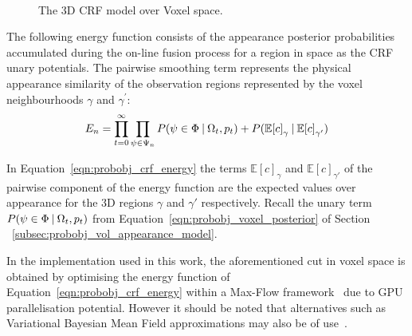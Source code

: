 \begin{figure}[!htbp]
{
  }
  \caption[3D CRF over Voxels]
  {The 3D CRF model over Voxel space.}
~\label{figure:probobj_crf}
\end{figure}

The following energy function consists of the appearance posterior probabilities
accumulated during the on-line fusion process for a region in space as the
CRF unary potentials. The pairwise smoothing term represents the physical
appearance similarity of the observation regions represented by the
voxel neighbourhoods \( \gamma \) and \( \gamma^{'} \):
\begin{equation}
  \label{eqn:probobj_crf_energy}
  E_{n} = \prod_{t=0}^{\infty} \prod_{\psi \in \Psi_{n}}
  P(\psi \in \Phi \:\vert\: \Omega_{t}, p_{t}) +
  P(\mathbb{E}{[c]}_{\gamma} \:\vert\: \mathbb{E}{[c]}_{\gamma'})
\end{equation}

In Equation~\ref{eqn:probobj_crf_energy} the terms \(\mathbb{E}{[c]}_{\gamma}\) and
\(\mathbb{E}{[c]}_{\gamma'}\) of the pairwise component of the energy function are
the expected values over appearance for the 3D regions \( \gamma \) and \( \gamma' \)
respectively. Recall the unary term \(P(\psi \in \Phi \:\vert\: \Omega_{t}, p_{t})\)
from Equation~\ref{eqn:probobj_voxel_posterior} of Section
~\ref{subsec:probobj_vol_appearance_model}.

In the implementation used in this work, the aforementioned cut in voxel space
is obtained by optimising the energy function of Equation~\ref{eqn:probobj_crf_energy} 
within a Max-Flow framework~\cite{Boykov2001} due to GPU parallelisation potential. However 
it should be noted that alternatives such as Variational Bayesian Mean Field approximations 
may also be of use~\cite{Krahenbuhl2011}.

